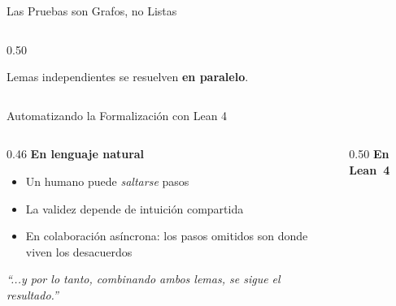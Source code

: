 \documentclass[aspectratio=169, 10pt]{beamer}
\newcommand{\yes}{\textcolor{cpTeal}{\checkmark}}
\begin{document}
\begin{frame}{Las Pruebas son Grafos, no Listas}
\begin{columns}[T]
\begin{column}{0.50\textwidth}
\par
      \vspace{0.1cm}
      {\small\color{cpGray}Lemas independientes se resuelven \textbf{en paralelo}.}
    \end{column}
  \end{columns}
\end{frame}

\begin{frame}{Automatizando la Formalización con Lean 4}
  \begin{columns}[T]
    \begin{column}{0.46\textwidth}
      \textbf{\color{cpGray}En lenguaje natural}
      \vspace{0.2cm}
      \begin{itemize}\small
        \item Un humano puede \emph{saltarse} pasos
        \item La validez depende de intuici\'{o}n compartida
        \item En colaboraci\'{o}n as\'{i}ncrona: los pasos omitidos son donde viven los desacuerdos
      \end{itemize}
      \vspace{0.3cm}
      {\footnotesize\color{cpGray}\textit{\textquotedblleft{}...y por lo tanto,
      combinando ambos lemas, se sigue el resultado.\textquotedblright{}}}
    \end{column}
    \begin{column}{0.50\textwidth}
      \textbf{\color{leanpurple}En Lean~4}
      \vspace{0.2cm}


\end{column}
\end{columns}
\end{frame}
\end{document}
